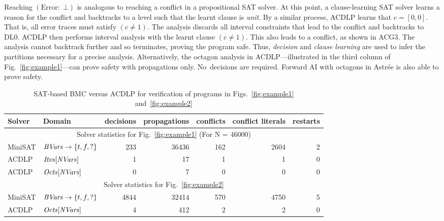 Reaching $(\mathrm{Error}{:}\;\bot)$ is analogous to reaching a conflict in
a propositional SAT solver.  At this point, a clause-learning SAT solver
learns a reason for the conflict and backtracks to a level such that the
learnt clause is \textit{unit}.  By a similar process, ACDLP learns that
$c=[0,0]$.  That is, all error traces must satisfy $(c \neq 1)$.  The
analysis discards all interval constraints that lead to the conflict and
backtracks to DL0.  ACDLP then performs interval analysis with the learnt
clause $(c \neq 1)$.  This also leads to a conflict, as shown in ACG3.  The
analysis cannot backtrack further and so terminates, proving the program
safe.  Thus, {\em decision} and {\em clause learning} are used to infer the
partitions necessary for a precise analysis.  Alternatively, the octagon
analysis in ACDLP---illustrated in the third column of
Fig.~\ref{fig:example1}---can prove safety with propagations only. 
No~decisions are required.  Forward AI with octagons in Astr{\'e}e is also
able to prove safety.  
%
\begin{table}[!b]
\begin{center}
{
\begin{tabular}{l|l|r|r|r|r|r}
\hline
  Solver & Domain & decisions & propagations & conflicts & conflict literals & restarts \\ \hline
  \multicolumn{7}{c}{Solver statistics for Fig.~\ref{fig:example1} (For N = 46000)} \\ \hline
  MiniSAT & $\mathit{BVars} \rightarrow \{t,f,?\} $ & 233 & 36436 & 162 & 2604 & 2 \\ \hline
  ACDLP & $\mathit{Itvs}[\mathit{NVars}]$ & 1 & 17 & 1 & 1 & 0 \\ \hline
  ACDLP & $\mathit{Octs}[\mathit{NVars}]$ & 0 & 7 & 0 & 0 & 0 \\ \hline 
  \multicolumn{7}{c}{Solver statistics for Fig.~\ref{fig:example2}} \\ \hline
  MiniSAT & $\mathit{BVars} \rightarrow \{t,f,?\} $ & 4844 & 32414 & 570 & 4750 & 5 \\ \hline
  ACDLP & $\mathit{Octs}[\mathit{NVars}]$ & 4 & 412 & 2 & 2 & 0 \\ 
\hline
\end{tabular}
}
\end{center}
\caption{SAT-based BMC versus ACDLP for verification of programs in Figs.~\ref{fig:example1} and~\ref{fig:example2}}
\label{solver}
\end{table}
%
%
